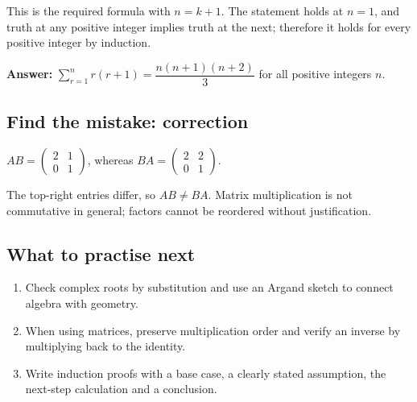 \documentclass[10pt,a4paper]{article}
\begin{document}
This is the required formula with \(n=k+1\). The statement holds at \(n=1\), and truth at any positive integer implies truth at the next; therefore it holds for every positive integer by induction.

\textbf{Answer:} \(\displaystyle\sum_{r=1}^{n}r(r+1)=\dfrac{n(n+1)(n+2)}3\) for all positive integers \(n\).

\subsection*{Find the mistake: correction}
\(AB=\begin{pmatrix}2&1\\0&1\end{pmatrix}\), whereas \(BA=\begin{pmatrix}2&2\\0&1\end{pmatrix}\).

The top-right entries differ, so \(AB\neq BA\). Matrix multiplication is not commutative in general; factors cannot be reordered without justification.

\subsection*{What to practise next}\begin{enumerate}
\item Check complex roots by substitution and use an Argand sketch to connect algebra with geometry.
\item When using matrices, preserve multiplication order and verify an inverse by multiplying back to the identity.
\item Write induction proofs with a base case, a clearly stated assumption, the next-step calculation and a conclusion.
\end{enumerate}
\end{document}
